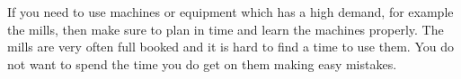 \documentclass[11pt,a4paper]{amsart}
\begin{document}
\begin{multicols}{2}
If you need to use machines or equipment which has a high demand, for example the mills, then make sure to plan in time and learn the machines properly. The mills are very often full booked and it is hard to find a time to use them. You do not want to spend the time you do get on them making easy mistakes.  
\end{multicols}
\end{document}
